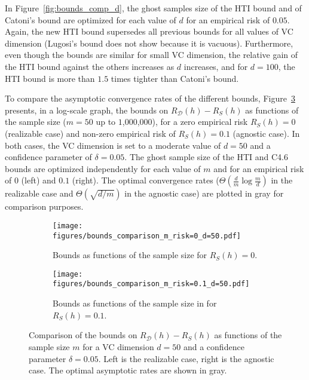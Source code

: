 \documentclass[twoside,11pt]{article}
\newcommand{\D}{\mathcal{D}}
\begin{document}
In Figure~\ref{fig:bounds_comp_d}, the ghost samples size of the HTI bound and of Catoni's bound are optimized for each value of $d$ for an empirical risk of $0.05$.
Again, the new HTI bound supersedes all previous bounds for all values of VC dimension (Lugosi's bound does not show because it is vacuous).
Furthermore, even though the bounds are similar for small VC dimension, the relative gain of the HTI bound against the others increases as $d$ increases, and for $d=100$, the HTI bound is more than $1.5$ times tighter than Catoni's bound.





To compare the asymptotic convergence rates of the different bounds, Figure~\ref{fig:bounds_comparison_m} presents, in a log-scale graph, the bounds on $R_\D(h) - R_S(h)$ as functions of the sample size ($m=50$ up to $1$,$000$,$000$), for a zero empirical risk $R_S(h) = 0$ (realizable case) and non-zero empirical risk of $R_S(h) = 0.1$ (agnostic case).
In both cases, the VC dimension is set to a moderate value of $d=50$ and a confidence parameter of $\delta=0.05$.
The ghost sample size of the HTI and C4.6 bounds are optimized independently for each value of $m$ and for an empirical risk of $0$ (left) and $0.1$ (right).
The optimal convergence rates ($\Theta(\frac{d}{m}\log \frac{m}{d})$ in the realizable case and $\Theta(\sqrt{d/m})$ in the agnostic case) are plotted in gray for comparison purposes.

\begin{figure}[h]
\centering
\begin{subfigure}[t]{0.485\textwidth}
    \centering
    \texttt{[image: figures/bounds\_comparison\_m\_risk=0\_d=50.pdf]}
    \caption{Bounds as functions of the sample size for $R_S(h)=0$.}
    \label{fig:bounds_comp_m_risk=0_d=50}
\end{subfigure}\hfill
\begin{subfigure}[t]{0.485\textwidth}
    \centering
    \texttt{[image: figures/bounds\_comparison\_m\_risk=0.1\_d=50.pdf]}
    \caption{Bounds as functions of the sample size in for $R_S(h)=0.1$.}
    \label{fig:bounds_comp_m_risk=0.1_d=50}
\end{subfigure}
\caption{Comparison of the bounds on $R_\D(h) - R_S(h)$ as functions of the sample size $m$ for a VC dimension $d=50$ and a confidence parameter $\delta=0.05$. Left is the realizable case, right is the agnostic case. The optimal asymptotic rates are shown in gray.
}
\label{fig:bounds_comparison_m}
\end{figure}
\end{document}

